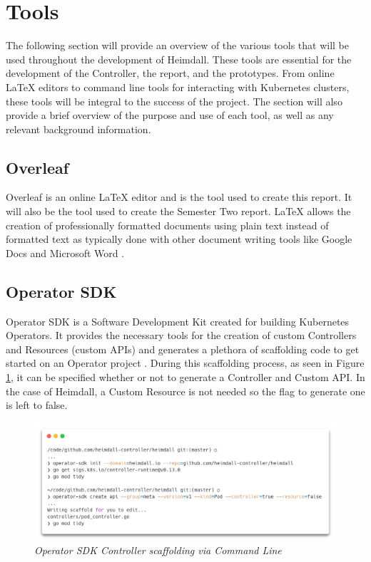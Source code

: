 \documentclass{article}
\begin{document}
\section{Tools}

The following section will provide an overview of the various tools that will be used throughout the development of Heimdall. These tools are essential for the development of the Controller, the report, and the prototypes. From online LaTeX editors to command line tools for interacting with Kubernetes clusters, these tools will be integral to the success of the project. The section will also provide a brief overview of the purpose and use of each tool, as well as any relevant background information.


\subsection{Overleaf}

Overleaf is an online LaTeX editor and is the tool used to create this report. It will also be the tool used to create the Semester Two report. LaTeX allows the creation of professionally formatted documents using plain text instead of formatted text as typically done with other document writing tools like Google Docs and Microsoft Word \cite{overleaf}.


\subsection{Operator SDK} \label{osdk}

Operator SDK is a Software Development Kit created for building Kubernetes Operators. It provides the necessary tools for the creation of custom Controllers and Resources (custom APIs) and generates a plethora of scaffolding code to get started on an Operator project \cite{osdk-overview}. During this scaffolding process, as seen in Figure \ref{osdk-img}, it can be specified whether or not to generate a Controller and Custom API. In the case of Heimdall, a Custom Resource is not needed so the flag to generate one is left to false.

\begin{figure}[H]
    \centering
    \includegraphics[width=160mm]{tools/osdk.png}
    \caption{\emph{Operator SDK Controller scaffolding via Command Line}}
    \label{osdk-img}
\end{figure}
\end{document}
